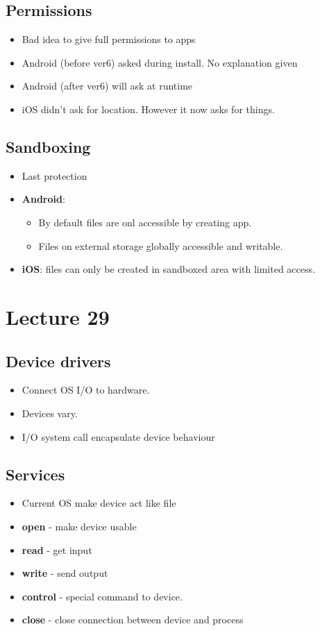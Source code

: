 \documentclass{article}
\begin{document}
	\subsection{Permissions}
		\begin{itemize}
			\item Bad idea to give full permissions to apps
			\item Android (before ver6) asked during install. No explanation given
			\item Android (after ver6) will ask at runtime
			\item iOS didn't ask for location. However it now asks for things.
		\end{itemize}
	
	\subsection{Sandboxing}
		\begin{itemize}
			\item Last protection
			\item \textbf{Android}: 
			\begin{itemize}
				\item By default files are onl accessible by creating app.
				\item Files on external storage globally accessible and writable.
			\end{itemize}
			\item \textbf{iOS}: files can only be created in sandboxed area with limited access.
		\end{itemize}
		
		
\section{Lecture 29}
	\subsection{Device drivers}
		\begin{itemize}
			\item Connect OS I/O to hardware. 
			\item Devices vary.
			\item I/O system call encapsulate device behaviour			
		\end{itemize}
	
	\subsection{Services}
		\begin{itemize}
			\item Current OS make device act like file
			\item \textbf{open} - make device usable
			\item \textbf{read} - get input
			\item \textbf{write} - send output
			\item \textbf{control} - special command to device.
			\item \textbf{close} - close connection between device and process
		\end{itemize}
			
\end{document}
